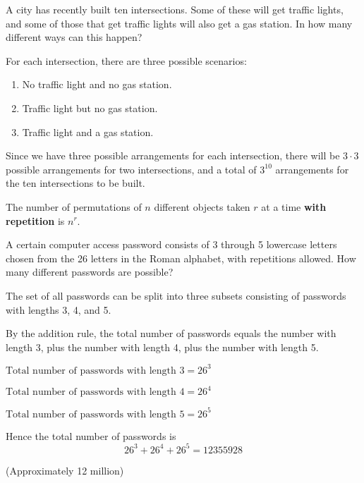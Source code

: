 \documentclass[11pt,a4paper]{book}
\begin{document}
\begin{example}

A city has recently built ten intersections. Some of these will get
traffic lights, and some of those that get traffic lights will also
get a gas station. In how many different ways can this happen?

\Solution

For each intersection, there are three possible scenarios:

\begin{enumerate}

\item  No traffic light and no gas station.

\item  Traffic light but no gas station.

\item  Traffic light and a gas station.

\end{enumerate}

Since we have three possible arrangements for each intersection, there
will be $3\cdot3$ possible arrangements for two intersections, and
a total of $3^{10}$ arrangements for the ten intersections to be
built.

\end{example}

\medskip{}


\begin{tcolorbox}[colback=blue!5, colframe=black, boxrule=.4pt, sharpish corners]

The number of permutations of $n$ different objects taken $r$ at
a time \textbf{with repetition }is $n^{r}$.
\end{tcolorbox}


\begin{example}

A certain computer access password consists of 3 through 5 lowercase
letters chosen from the 26 letters in the Roman alphabet, with repetitions allowed. How many different passwords are possible?


\Solution

The set of all passwords can be split into three subsets consisting
of passwords with lengths 3, 4, and 5.

By the addition rule, the total number of passwords equals the number
with length 3, plus the number with length 4, plus the number with
length 5.

$\text{Total number of passwords with length 3}=26^{3}$

$\text{Total number of passwords with length 4}=26^{4}$

$\text{Total number of passwords with length 5}=26^{5}$

Hence the total number of passwords is
\[
26^{3}+26^{4}+26^{5}=12355928
\]

(Approximately 12 million)

\end{example}
\end{document}
